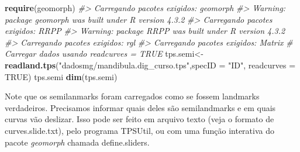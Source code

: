 \documentclass[
]{book}
\newenvironment{Shaded}{\begin{snugshade}}{\end{snugshade}}
\newcommand{\AttributeTok}[1]{\textcolor[rgb]{0.13,0.29,0.53}{#1}}
\newcommand{\CommentTok}[1]{\textcolor[rgb]{0.56,0.35,0.01}{\textit{#1}}}
\newcommand{\ConstantTok}[1]{\textcolor[rgb]{0.56,0.35,0.01}{#1}}
\newcommand{\FunctionTok}[1]{\textcolor[rgb]{0.13,0.29,0.53}{\textbf{#1}}}
\newcommand{\NormalTok}[1]{#1}
\newcommand{\OtherTok}[1]{\textcolor[rgb]{0.56,0.35,0.01}{#1}}
\newcommand{\StringTok}[1]{\textcolor[rgb]{0.31,0.60,0.02}{#1}}
\begin{document}
\begin{Shaded}
\begin{Highlighting}[]
\FunctionTok{require}\NormalTok{(geomorph)}
\CommentTok{\#\textgreater{} Carregando pacotes exigidos: geomorph}
\CommentTok{\#\textgreater{} Warning: package \textquotesingle{}geomorph\textquotesingle{} was built under R version 4.3.2}
\CommentTok{\#\textgreater{} Carregando pacotes exigidos: RRPP}
\CommentTok{\#\textgreater{} Warning: package \textquotesingle{}RRPP\textquotesingle{} was built under R version 4.3.2}
\CommentTok{\#\textgreater{} Carregando pacotes exigidos: rgl}
\CommentTok{\#\textgreater{} Carregando pacotes exigidos: Matrix}
\CommentTok{\# Carregar dados usando readcurves = TRUE}
\NormalTok{tps.semi}\OtherTok{\textless{}{-}}\FunctionTok{readland.tps}\NormalTok{(}\StringTok{"dadosmg/mandibula.dig\_curso.tps"}\NormalTok{,}\AttributeTok{specID =} \StringTok{"ID"}\NormalTok{, }\AttributeTok{readcurves =} \ConstantTok{TRUE}\NormalTok{)}
\NormalTok{tps.semi}
\FunctionTok{dim}\NormalTok{(tps.semi)}
\end{Highlighting}
\end{Shaded}

Note que os semilanmarks foram carregados como se fossem landmarks verdadeiros.
Precisamos informar quais deles são semilandmarks e em quais curvas vão deslizar.
Isso pode ser feito em arquivo texto (veja o formato de curves.slide.txt), pelo programa TPSUtil, ou com uma função interativa do pacote \emph{geomorph} chamada define.sliders.
\end{document}
